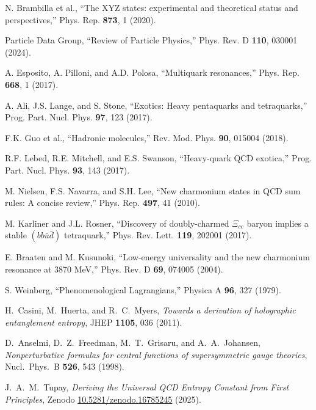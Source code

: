 \documentclass[12pt,a4paper]{article}
\begin{document}
\begin{thebibliography}{99}
N. Brambilla et al.,
``The XYZ states: experimental and theoretical status and perspectives,''
Phys. Rep. \textbf{873}, 1 (2020).

Particle Data Group,
``Review of Particle Physics,''
Phys. Rev. D \textbf{110}, 030001 (2024).

A. Esposito, A. Pilloni, and A.D. Polosa,
``Multiquark resonances,''
Phys. Rep. \textbf{668}, 1 (2017).

A. Ali, J.S. Lange, and S. Stone,
``Exotics: Heavy pentaquarks and tetraquarks,''
Prog. Part. Nucl. Phys. \textbf{97}, 123 (2017).

F.K. Guo et al.,
``Hadronic molecules,''
Rev. Mod. Phys. \textbf{90}, 015004 (2018).

R.F. Lebed, R.E. Mitchell, and E.S. Swanson,
``Heavy-quark QCD exotica,''
Prog. Part. Nucl. Phys. \textbf{93}, 143 (2017).

M. Nielsen, F.S. Navarra, and S.H. Lee,
``New charmonium states in QCD sum rules: A concise review,''
Phys. Rep. \textbf{497}, 41 (2010).

M. Karliner and J.L. Rosner,
``Discovery of doubly-charmed $\Xi_{cc}$ baryon implies a stable $(bb\bar{u}\bar{d})$ tetraquark,''
Phys. Rev. Lett. \textbf{119}, 202001 (2017).

E. Braaten and M. Kusunoki,
``Low-energy universality and the new charmonium resonance at 3870 MeV,''
Phys. Rev. D \textbf{69}, 074005 (2004).

S. Weinberg,
``Phenomenological Lagrangians,''
Physica A \textbf{96}, 327 (1979).

H.~Casini, M.~Huerta, and R.~C.~Myers, \emph{Towards a derivation of holographic entanglement entropy}, JHEP \textbf{1105}, 036 (2011).

D.~Anselmi, D.~Z.~Freedman, M.~T.~Grisaru, and A.~A.~Johansen, \emph{Nonperturbative formulas for central functions of supersymmetric gauge theories}, Nucl.\ Phys.\ B \textbf{526}, 543 (1998).

J.~A.~M.~Tupay, \emph{Deriving the Universal QCD Entropy Constant from First Principles}, Zenodo \href{https://doi.org/10.5281/zenodo.16785245}{10.5281/zenodo.16785245} (2025).

\end{thebibliography}
\end{document}
